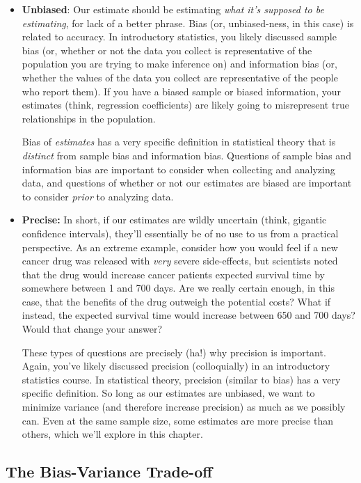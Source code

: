 \documentclass[
  letterpaper,
  DIV=11,
  numbers=noendperiod]{scrreprt}
\begin{document}
\begin{itemize}
\item
  \textbf{Unbiased}: Our estimate should be estimating \emph{what it's
  supposed to be estimating}, for lack of a better phrase. Bias (or,
  unbiased-ness, in this case) is related to accuracy. In introductory
  statistics, you likely discussed sample bias (or, whether or not the
  data you collect is representative of the population you are trying to
  make inference on) and information bias (or, whether the values of the
  data you collect are representative of the people who report them). If
  you have a biased sample or biased information, your estimates (think,
  regression coefficients) are likely going to misrepresent true
  relationships in the population.

  Bias of \emph{estimates} has a very specific definition in statistical
  theory that is \emph{distinct} from sample bias and information bias.
  Questions of sample bias and information bias are important to
  consider when collecting and analyzing data, and questions of whether
  or not our estimates are biased are important to consider \emph{prior}
  to analyzing data.
\item
  \textbf{Precise:} In short, if our estimates are wildly uncertain
  (think, gigantic confidence intervals), they'll essentially be of no
  use to us from a practical perspective. As an extreme example,
  consider how you would feel if a new cancer drug was released with
  \emph{very} severe side-effects, but scientists noted that the drug
  would increase cancer patients expected survival time by somewhere
  between 1 and 700 days. Are we really certain enough, in this case,
  that the benefits of the drug outweigh the potential costs? What if
  instead, the expected survival time would increase between 650 and 700
  days? Would that change your answer?

  These types of questions are precisely (ha!) why precision is
  important. Again, you've likely discussed precision (colloquially) in
  an introductory statistics course. In statistical theory, precision
  (similar to bias) has a very specific definition. So long as our
  estimates are unbiased, we want to minimize variance (and therefore
  increase precision) as much as we possibly can. Even at the same
  sample size, some estimates are more precise than others, which we'll
  explore in this chapter.
\end{itemize}

\subsection*{The Bias-Variance
Trade-off}\label{the-bias-variance-trade-off}
\end{document}
